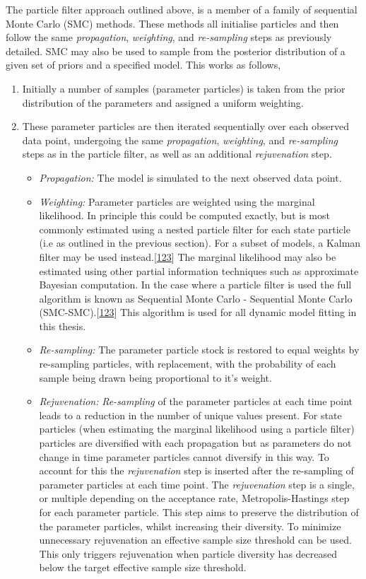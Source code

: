 \documentclass[11pt,twoside]{bristolthesis}
\begin{document}
  The particle filter approach outlined above, is a member of a family of sequential Monte Carlo (SMC) methods. These methods all initialise particles and then follow the same \emph{propagation}, \emph{weighting}, and \emph{re-sampling} steps as previously detailed. SMC may also be used to sample from the posterior distribution of a given set of priors and a specified model. This works as follows,
  \begin{enumerate}
  \def\labelenumi{\arabic{enumi}.}
  \item
    Initially a number of samples (parameter particles) is taken from the prior distribution of the parameters and assigned a uniform weighting.
  \item
    These parameter particles are then iterated sequentially over each observed data point, undergoing the same \emph{propagation}, \emph{weighting}, and \emph{re-sampling} steps as in the particle filter, as well as an additional \emph{rejuvenation} step.
    \begin{itemize}
    \item
      \emph{Propagation:} The model is simulated to the next observed data point.
    \item
      \emph{Weighting:} Parameter particles are weighted using the marginal likelihood. In principle this could be computed exactly, but is most commonly estimated using a nested particle filter for each state particle (i.e as outlined in the previous section). For a subset of models, a Kalman filter may be used instead.{[}\protect\hyperlink{ref-Murray2015}{123}{]} The marginal likelihood may also be estimated using other partial information techniques such as approximate Bayesian computation. In the case where a particle filter is used the full algorithm is known as Sequential Monte Carlo - Sequential Monte Carlo (SMC-SMC).{[}\protect\hyperlink{ref-Murray2015}{123}{]} This algorithm is used for all dynamic model fitting in this thesis.
    \item
      \emph{Re-sampling:} The parameter particle stock is restored to equal weights by re-sampling particles, with replacement, with the probability of each sample being drawn being proportional to it's weight.
    \item
      \emph{Rejuvenation:} \emph{Re-sampling} of the parameter particles at each time point leads to a reduction in the number of unique values present. For state particles (when estimating the marginal likelihood using a particle filter) particles are diversified with each propagation but as parameters do not change in time parameter particles cannot diversify in this way. To account for this the \emph{rejuvenation} step is inserted after the re-sampling of parameter particles at each time point. The \emph{rejuvenation} step is a single, or multiple depending on the acceptance rate, Metropolis-Hastings step for each parameter particle. This step aims to preserve the distribution of the parameter particles, whilst increasing their diversity. To minimize unnecessary rejuvenation an effective sample size threshold can be used. This only triggers rejuvenation when particle diversity has decreased below the target effective sample size threshold.
    \end{itemize}
  \end{enumerate}
\end{document}
